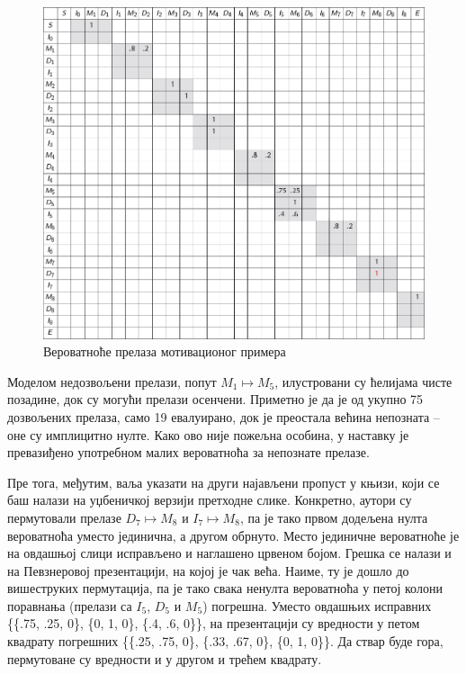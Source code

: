 \documentclass[12pt,oneside]{memoir}
\begin{document}
\begin{CJK}{UTF8}{ipxm}
\begin{figure}[H]
  \centering
  \includegraphics[width=\textwidth]{prelazi.png}
  \caption{Вероватноће прелаза мотивационог примера\cite{compeau2015}}
  \label{fig:prelazi}
\end{figure}

Моделом недозвољени прелази, попут $M_1 \mapsto M_5$, илустровани су ћелијама чисте позадине, док су могући прелази осенчени. Приметно је да је од укупно 75 дозвољених прелаза, само 19 евалуирано, док је преостала већина непозната -- оне су имплицитно нулте. Како ово није пожељна особина, у наставку је превазиђено употребном малих вероватноћа за непознате прелазе.

Пре тога, међутим, ваља указати на други најављени пропуст у књизи, који се баш налази на уџбеничкој верзији претходне слике. Конкретно, аутори су пермутовали прелазе $D_7 \mapsto M_8$ и $I_7 \mapsto M_8$, па је тако првом додељена нулта вероватноћа уместо јединична, а другом обрнуто. Место јединичне вероватноће је на овдашњој слици исправљено и наглашено црвеном бојом. Грешка се налази и на Певзнеровој презентацији, на којој је чак већа. Наиме, ту је дошло до вишеструких пермутација, па је тако свака ненулта вероватноћа у петој колони поравнања (прелази са $I_5$, $D_5$ и $M_5$) погрешна. Уместо овдашњих исправних \{\{.75, .25, 0\}, \{0, 1, 0\}, \{.4, .6, 0\}\}, на презентацији су вредности у петом квадрату погрешних \{\{.25, .75, 0\}, \{.33, .67, 0\}, \{0, 1, 0\}\}. Да ствар буде гора, пермутоване су вредности и у другом и трећем квадрату.


\end{CJK}
\end{document}
